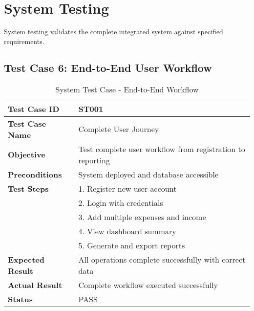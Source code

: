 \section{System Testing}

System testing validates the complete integrated system against specified requirements.

\subsection{Test Case 6: End-to-End User Workflow}
\begin{table}[h]
\centering
\begin{tabular}{|p{3cm}|p{10cm}|}
\hline
\textbf{Test Case ID} & ST001 \\
\hline
\textbf{Test Case Name} & Complete User Journey \\
\hline
\textbf{Objective} & Test complete user workflow from registration to reporting \\
\hline
\textbf{Preconditions} & System deployed and database accessible \\
\hline
\textbf{Test Steps} & 1. Register new user account\\
& 2. Login with credentials\\
& 3. Add multiple expenses and income\\
& 4. View dashboard summary\\
& 5. Generate and export reports \\
\hline
\textbf{Expected Result} & All operations complete successfully with correct data \\
\hline
\textbf{Actual Result} & Complete workflow executed successfully \\
\hline
\textbf{Status} & PASS \\
\hline
\end{tabular}
\caption{System Test Case - End-to-End Workflow}
\end{table}

